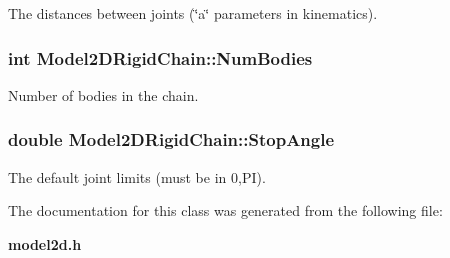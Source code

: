 The distances between joints (\char`\"{}a\char`\"{} parameters in kinematics).

\subsubsection{\setlength{\rightskip}{0pt plus 5cm}int Model2DRigid\-Chain::Num\-Bodies}\label{class_Model2DRigidChain_m0}


Number of bodies in the chain.

\subsubsection{\setlength{\rightskip}{0pt plus 5cm}double Model2DRigid\-Chain::Stop\-Angle}\label{class_Model2DRigidChain_m2}


The default joint limits (must be in 0,PI).



The documentation for this class was generated from the following file:\begin{CompactItemize}
\item 
{\bf model2d.h}\end{CompactItemize}
